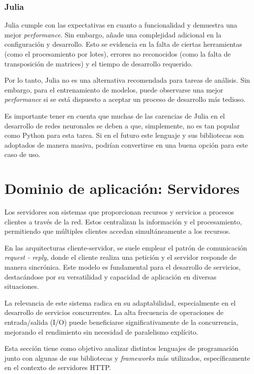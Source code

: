 \documentclass[11pt]{article}
\let\Oldsection\section
\renewcommand{\section}{\FloatBarrier\Oldsection}
\let\Oldsubsubsection\subsubsection
\renewcommand{\subsubsection}{\FloatBarrier\Oldsubsubsection}
\newcommand{\english}[1]{\textit{#1}}
\begin{document}
\subsubsection{Julia}

Julia cumple con las expectativas en cuanto a funcionalidad y demuestra una mejor \english{performance}. Sin embargo, añade una complejidad adicional en la configuración y desarrollo. Esto se evidencia en la falta de ciertas herramientas (como el procesamiento por lotes), errores no reconocidos (como la falta de transposición de matrices) y el tiempo de desarrollo requerido.

Por lo tanto, Julia no es una alternativa recomendada para tareas de análisis. Sin embargo, para el entrenamiento de modelos, puede observarse una mejor \english{performance} si se está dispuesto a aceptar un proceso de desarrollo más tedioso.

Es importante tener en cuenta que muchas de las carencias de Julia en el desarrollo de redes neuronales se deben a que, simplemente, no es tan popular como Python para esta tarea. Si en el futuro este lenguaje y sus bibliotecas son adoptados de manera masiva, podrían convertirse en una buena opción para este caso de uso.

\newpage

\section{Dominio de aplicación: Servidores}

Los servidores son sistemas que proporcionan recursos y servicios a procesos clientes a través de la red. Estos centralizan la información y el procesamiento, permitiendo que múltiples clientes accedan simultáneamente a los recursos.

En las arquitecturas cliente-servidor, se suele emplear el patrón de comunicación \english{request - reply}, donde el cliente realiza una petición y el servidor responde de manera sincrónica. Este modelo es fundamental para el desarrollo de servicios, destacándose por su versatilidad y capacidad de aplicación en diversas situaciones.

La relevancia de este sistema radica en su adaptabilidad, especialmente en el desarrollo de servicios concurrentes. La alta frecuencia de operaciones de entrada/salida (I/O) puede beneficiarse significativamente de la concurrencia, mejorando el rendimiento sin necesidad de paralelismo explícito.

Esta sección tiene como objetivo analizar distintos lenguajes de programación junto con algunas de sus bibliotecas y \english{frameworks} más utilizados, específicamente en el contexto de servidores HTTP.
\end{document}
